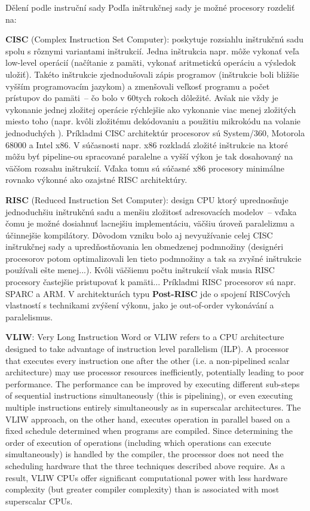 \begin{obecne}{Dělení podle instruční sady}
Podľa inštrukčnej sady je možné procesory rozdeliť na:
\begin{pitemize}
	\item \textbf{CISC} (Complex Instruction Set Computer): poskytuje rozsiahlu inštrukčnú sadu spolu s rôznymi variantami inštrukcií. Jedna inštrukcia napr. môže vykonať veľa low-level operácií (načítanie z pamäti, vykonať aritmetickú operáciu a výsledok uložiť). Takéto inštrukcie zjednodušovali zápis programov (inštrukcie boli bližšie vyšším programovacím jazykom) a zmenšovali veľkosť programu a počet prístupov do pamäti~-- čo bolo v 60tych rokoch dôležité. Avšak nie vždy je vykonanie jednej zložitej operácie rýchlejšie ako vykonanie viac menej zložitých miesto toho (napr. kvôli zložitému dekódovaniu a použitiu mikrokódu na volanie jednoduchých ). Príkladmi CISC architektúr procesorov sú System/360, Motorola 68000 a Intel x86. V súčasnosti napr. x86 rozkladá zložité inštrukcie na  ktoré môžu byť pipeline-ou spracované paralelne a vyšší výkon je tak dosahovaný na väčšom rozsahu inštrukcií. Vďaka tomu sú súčasné x86 procesory minimálne rovnako výkonné ako ozajstné RISC architektúry.
	\item \textbf{RISC} (Reduced Instruction Set Computer): design CPU ktorý uprednosňuje jednoduchšiu inštrukčnú sadu a menšiu zložitosť adresovacích modelov~-- vďaka čomu je možné dosiahnuť lacnejšiu implementáciu, väčšiu úroveň paralelizmu a účinnejšie kompilátory. Dôvodom vzniku bolo aj nevyužívanie celej CISC inštrukčnej sady a upredňostňovania len obmedzenej podmnožiny (designéri procesorov potom optimalizovali len tieto podmnožiny a tak sa zvyšné inštrukcie používali ešte menej...). Kvôli väčšiemu počtu inštrukcií však musia RISC procesory častejšie pristupovať k pamäti... Príkladmi RISC procesorov sú napr. SPARC a ARM. V architekturách typu \textbf{Post-RISC} jde o spojení RISCových vlastností s technikami zvýšení výkonu, jako je out-of-order vykonávání a paralelismus.
    \item \textbf{VLIW}: Very Long Instruction Word or VLIW refers to a CPU architecture designed to take advantage of instruction level parallelism (ILP). A processor that executes every instruction one after the other (i.e. a non-pipelined scalar architecture) may use processor resources inefficiently, potentially leading to poor performance. The performance can be improved by executing different sub-steps of sequential instructions simultaneously (this is pipelining), or even executing multiple instructions entirely simultaneously as in superscalar architectures. The VLIW approach, on the other hand, executes operation in parallel based on a fixed schedule determined when programs are compiled. Since determining the order of execution of operations (including which operations can execute simultaneously) is handled by the compiler, the processor does not need the scheduling hardware that the three techniques described above require. As a result, VLIW CPUs offer significant computational power with less hardware complexity (but greater compiler complexity) than is associated with most superscalar CPUs.

\end{pitemize}
\end{obecne}
